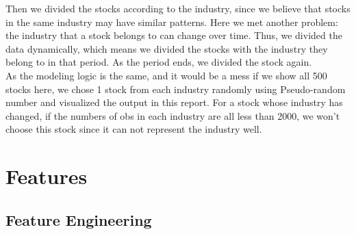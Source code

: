 \documentclass[fleqn,10pt]{SelfArx} %
\begin{document}
\newline
\noindent
Then we divided the stocks according to the industry, since we believe that stocks in the same industry may have similar patterns. Here we met another problem: the industry that a stock belongs to can change over time. Thus, we divided the data dynamically, which means we divided the stocks with the industry they belong to in that period. As the period ends, we divided the stock again.\\
\newline
\noindent
As the modeling logic is the same, and it would be a mess if we show all 500 stocks here, we chose 1 stock from each industry randomly using Pseudo-random number and visualized the output in this report. For a stock whose industry has changed, if the numbers of obs in each industry are all less than 2000, we won't choose this stock since it can not represent the industry well.


\section{Features}

\subsection{Feature Engineering}
\end{document}
